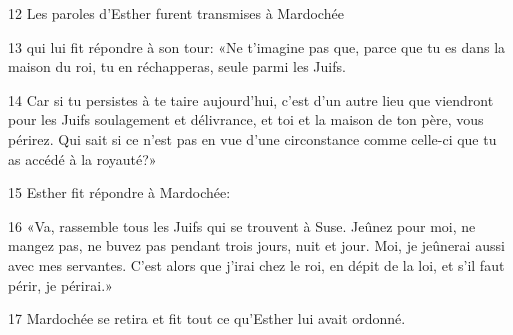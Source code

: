 
12 Les paroles d’Esther furent transmises à Mardochée

13 qui lui fit répondre à son tour: «Ne t’imagine pas que, parce que tu es dans la maison du roi, tu en réchapperas, seule parmi les Juifs.

14 Car si tu persistes à te taire aujourd’hui, c’est d’un autre lieu que viendront pour les Juifs soulagement et délivrance, et toi et la maison de ton père, vous périrez. Qui sait si ce n’est pas en vue d’une circonstance comme celle-ci que tu as accédé à la royauté?»

15 Esther fit répondre à Mardochée:

16 «Va, rassemble tous les Juifs qui se trouvent à Suse. Jeûnez pour moi, ne mangez pas, ne buvez pas pendant trois jours, nuit et jour. Moi, je jeûnerai aussi avec mes servantes. C’est alors que j’irai chez le roi, en dépit de la loi, et s’il faut périr, je périrai.»

17 Mardochée se retira et fit tout ce qu’Esther lui avait ordonné.
